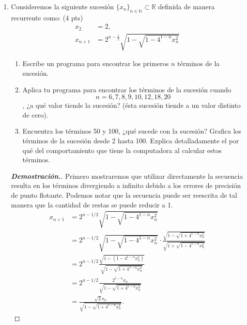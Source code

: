 \documentclass{article}
\newcommand{\N}{\mathbb N}
\newcommand{\R}{\mathbb R}
\begin{document}
\begin{enumerate}
	\item Consideremos la siguiente sucesi\'on $\{x_n\}_{n\in \N} \subset \R$ definida de manera recurrente como: (4 pts)
	      \begin{align*}
		      x_2     & =2,                                               \\
		      x_{n+1} & = 2^{n-\frac{1}{2}}\sqrt{1-\sqrt{1-4^{1-n}x^2_n}}
	      \end{align*}
	      \begin{enumerate}
		      \item Escribe un programa para encontrar los primeros $n$ t\'erminos de la sucesi\'on.
		      \item Aplica tu programa para encontrar los t\'erminos de la sucesi\'on cuando $$n = 6, 7, 8, 9, 10,12, 18, 20$$, ¿a qu\'e valor tiende la sucesi\'on? (\'esta sucesi\'on tiende a un valor distinto de cero).
		      \item Encuentra los t\'erminos 50 y 100, ¿qu\'e sucede con la sucesi\'on? Grafica los t\'erminos de la sucesi\'on desde 2 hasta 100. Explica detalladamente el por qu\'e del comportamiento que tiene la computadora al calcular estos t\'erminos.
	      \end{enumerate}
	      \begin{mdframed}[
			      linecolor=darkgray,
		      ]
		      \begin{proof}[\textbf{Demostraci\'on.}]
			      Primero mostraremos que utilizar directamente la secuencia resulta en los t\'erminos divergiendo a infinito debido a los errores de precisi\'on de punto flotante.
			      Podemos notar que la secuencia puede ser reescrita de tal manera que la cantidad de restas se puede reducir a 1.
			      \begin{align*}
				      x_{n+1} & = 2^{n-1/2} \sqrt{1-\sqrt{1-4^{1-n}x^2_n}}                                                                            \\
				              & = 2^{n-1/2} \sqrt{1-\sqrt{1-4^{1-n}x^2_n}} \cdot\frac{\sqrt{1-\sqrt{1+4^{1-n}x^2_n}}}{\sqrt{1+\sqrt{1-4^{1-n}x^2_n}}} \\
				              & = 2^{n-1/2}\frac{\sqrt{1-(1-4^{1-n}x^2_n)}}{\sqrt{1-\sqrt{1+4^{1-n}x^2_n}}}                                           \\
				              & = 2^{n-1/2} \frac{2^{1-n}x_n}{\sqrt{1-\sqrt{1+4^{1-n}x^2_n}}}                                                         \\
				              & = \frac{\sqrt{2}x_n}{\sqrt{1-\sqrt{1+4^{1-n}x^2_n}}}.
			      \end{align*}
			      


\end{proof}
\end{mdframed}
\end{enumerate}
\end{document}
